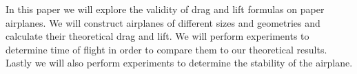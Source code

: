 % 
% 
%
In this paper we will explore the validity of drag and lift formulas on 
paper airplanes. We will construct airplanes of different sizes and geometries 
and calculate their theoretical drag and lift. We will perform experiments to
determine time of flight in order to compare them to our theoretical results.
Lastly we will also perform experiments to determine the stability of the airplane.
